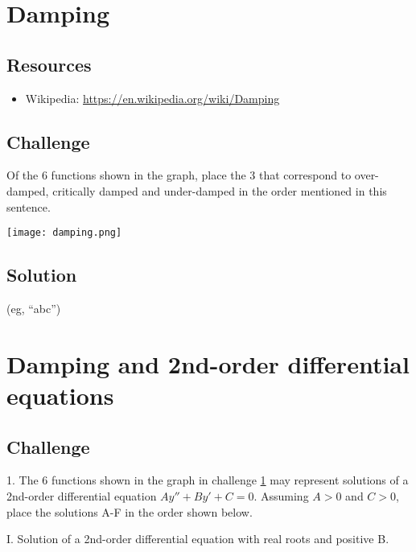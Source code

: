 \newpage
\section{Damping}
\label{sec:damping}

\subsection*{Resources}
\begin{itemize}
    \item Wikipedia: \url{https://en.wikipedia.org/wiki/Damping}
\end{itemize}

\subsection*{Challenge}
Of the 6 functions shown in the graph, place the 3 that correspond to over-damped, critically damped and under-damped in the order mentioned in this sentence.

\texttt{[image: damping.png]}

\subsection*{Solution}
(eg, ``abc'')





\newpage
\section{Damping and 2nd-order differential equations} %

\subsection*{Challenge}
1. The 6 functions shown in the graph in challenge \ref{sec:damping} may represent solutions of a 2nd-order differential equation $Ay'' + By' + C = 0$. Assuming $A>0$ and $C>0$, place the solutions A-F in the order shown below.%

I. Solution of a 2nd-order differential equation with real roots and positive B.


